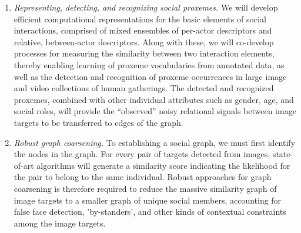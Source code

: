 \begin{enumerate}

\vspace{-0.1in}\item \emph{Representing, detecting, and recognizing social proxemes.} We will develop efficient computational representations for the basic elements of social interactions, comprised of mixed ensembles of per-actor descriptors and relative, between-actor descriptors. Along with these, we will co-develop processes for measuring the similarity between two interaction elements, thereby enabling learning of proxeme vocabularies from annotated data, as well as the detection and recognition of proxeme occurrences in large image and video collections of human gatherings. The detected and recognized proxemes, combined with other individual attributes such as gender, age, and social roles, will provide the ``observed'' noisy relational signals between image targets to be transferred to edges of the graph.

\vspace{-0.1in}\item \emph{Robust graph coarsening.} To establishing a social graph, we must first identify the nodes in the graph. For every pair of targets detected from images, state-of-art algorithms will generate a similarity score indicating the likelihood for the pair to belong to the same individual. Robust approaches for graph coarsening is therefore required to reduce the massive similarity graph of image targets to a smaller graph of unique social members, accounting for false face detection, 'by-standers', and other kinds of contextual constraints among the image targets.  



\end{enumerate}

